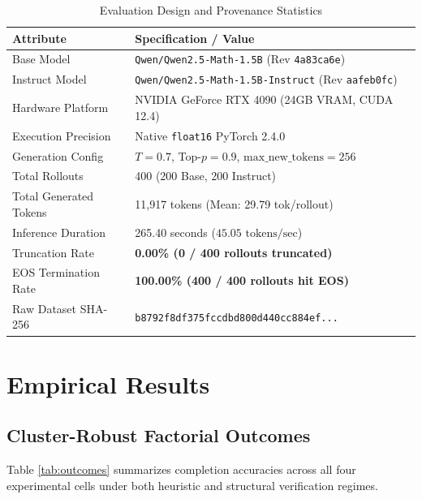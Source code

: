 \documentclass[10pt,conference]{IEEEtran}
\begin{document}
\begin{table}[htbp]
\caption{Evaluation Design and Provenance Statistics}
\label{tab:provenance}
\centering
\begin{tabular}{lp{5.2cm}}
\toprule
\textbf{Attribute} & \textbf{Specification / Value} \\
\midrule
Base Model & \texttt{Qwen/Qwen2.5-Math-1.5B} (Rev \texttt{4a83ca6e}) \\
Instruct Model & \texttt{Qwen/Qwen2.5-Math-1.5B-Instruct} (Rev \texttt{aafeb0fc}) \\
Hardware Platform & NVIDIA GeForce RTX 4090 (24GB VRAM, CUDA 12.4) \\
Execution Precision & Native \texttt{float16} PyTorch 2.4.0 \\
Generation Config & $T=0.7$, Top-$p=0.9$, $\text{max\_new\_tokens}=256$ \\
Total Rollouts & 400 (200 Base, 200 Instruct) \\
Total Generated Tokens & 11,917 tokens (Mean: 29.79 tok/rollout) \\
Inference Duration & 265.40 seconds ($45.05\text{ tokens/sec}$) \\
Truncation Rate & \textbf{0.00\% (0 / 400 rollouts truncated)} \\
EOS Termination Rate & \textbf{100.00\% (400 / 400 rollouts hit EOS)} \\
Raw Dataset SHA-256 & \texttt{b8792f8df375fccdbd800d440cc884ef...} \\
\bottomrule
\end{tabular}
\end{table}

\section{Empirical Results}

\subsection{Cluster-Robust Factorial Outcomes}
Table \ref{tab:outcomes} summarizes completion accuracies across all four experimental cells under both heuristic and structural verification regimes.
\end{document}
